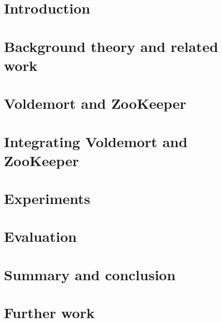 \documentclass[a4paper, 12pt, twoside]{report}
\begin{document}
\thispagestyle{empty}


\clearpage


\clearpage

\tableofcontents
\clearpage

\listoffigures

\clearpage
\setcounter{page}{1}

\chapter{Introduction}
\label{chapter:introduction}


\clearpage


\clearpage

\chapter{Background theory and related work}
\label{chapter:background}

\clearpage


\clearpage


\clearpage



\chapter{Voldemort and ZooKeeper}
\label{chapter:voldemort_and_zookeeper}


\clearpage


\clearpage

\chapter{Integrating Voldemort and ZooKeeper}
\label{chapter:implementation}

\clearpage

\chapter{Experiments}
\label{chapter:results}



\chapter{Evaluation}
\label{chapter:evaluation}


\chapter{Summary and conclusion}
\label{chapter:summary}


\chapter{Further work}
\label{chapter:futurework}




\end{document}
